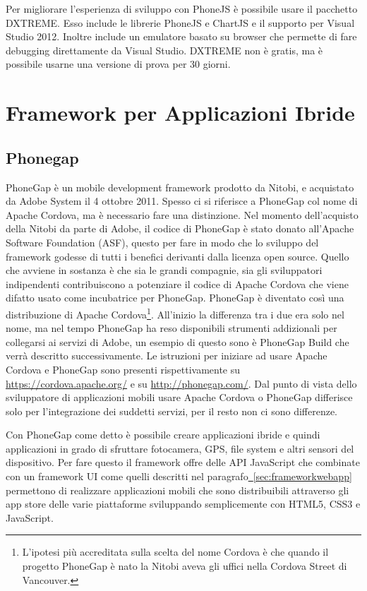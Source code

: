 			Per migliorare l'esperienza di sviluppo con PhoneJS è possibile usare 
			il pacchetto DXTREME. Esso include le librerie PhoneJS e ChartJS e il 
			supporto per Visual Studio 2012. Inoltre include un emulatore basato 
			su browser che permette di fare debugging direttamente da Visual Studio.
			DXTREME non è gratis, ma è possibile usarne una versione di prova per 
			30 giorni.
			
	\section{Framework per Applicazioni Ibride}
	\label{sec:frameworkhybrid}
		\subsection{Phonegap}
			PhoneGap è un mobile development framework prodotto da Nitobi, e 
			acquistato da Adobe System il 4 ottobre 2011.
			Spesso ci si riferisce a PhoneGap col nome di Apache Cordova, ma è 
			necessario fare una distinzione. 
			Nel momento dell'acquisto della Nitobi da parte di Adobe, il codice 
			di PhoneGap è stato donato all'Apache Software Foundation (ASF), 
			questo per fare in modo che lo sviluppo del framework godesse di 
			tutti i benefici derivanti dalla licenza open source.
			Quello che avviene in sostanza è che sia le grandi compagnie, sia 
			gli sviluppatori indipendenti contribuiscono a potenziare il codice 
			di Apache Cordova che viene difatto usato come incubatrice per PhoneGap.
			PhoneGap è diventato così una distribuzione di Apache Cordova\footnote{
			L'ipotesi più accreditata sulla scelta del nome Cordova
			è che quando il progetto PhoneGap è nato la Nitobi aveva gli uffici 
			nella Cordova Street di Vancouver.}. All'inizio la differenza tra 
			i due era solo nel nome, ma nel tempo PhoneGap ha reso disponibili 
			strumenti addizionali per collegarsi ai servizi di Adobe, un esempio 
			di questo sono è PhoneGap Build che verrà 
			descritto successivamente. Le istruzioni per iniziare ad usare 
			Apache Cordova e PhoneGap sono presenti rispettivamente su 
			\url{https://cordova.apache.org/} e su 
			\url{http://phonegap.com/}. Dal punto di vista dello sviluppatore di 
			applicazioni mobili usare Apache Cordova o PhoneGap differisce solo 
			per l'integrazione dei suddetti servizi, per il resto non ci sono 
			differenze.
			
			Con PhoneGap come detto è possibile creare applicazioni ibride e quindi 
			applicazioni in grado di sfruttare fotocamera, GPS, file system e 
			altri sensori del dispositivo. Per fare questo il framework offre 
			delle API JavaScript che combinate con un framework UI come quelli descritti 
			nel paragrafo\hyperref[sec:frameworkwebapp]{~\ref{sec:frameworkwebapp}}
			permettono di realizzare applicazioni mobili che sono distribuibili
			attraverso gli app store delle varie piattaforme sviluppando 
			semplicemente con HTML5, CSS3 e JavaScript.
			
